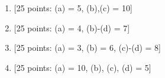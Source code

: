\documentclass[11pt]{article}
\begin{document}
\newpage
\setcounter{page}{1}
\begin{enumerate}

\item {[25 points: (a) = 5, (b),(c) = 10]}
\vspace*{.5em}


\newpage
\item {[25 points: (a) = 4, (b)-(d) = 7]}
\vspace*{.5em}


\newpage
\item {[25 points: (a) = 3, (b) = 6, (c)-(d) = 8]}
\vspace*{.5em}


\newpage
\item {[25 points: (a) = 10, (b), (c), (d) = 5]}
\vspace*{.5em}



%

%
%

%
%


%

\end{enumerate}
\end{document}
